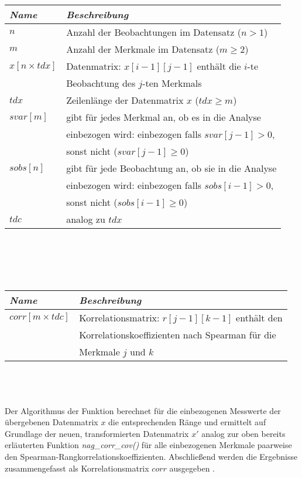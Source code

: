 \noindent \begin{tabular}[ht]{|l|l|}
  	\hline
  	\textit{Name} & \textit{Beschreibung}\\
  	\hline \hline
  	$n$ & Anzahl der Beobachtungen im Datensatz ($n > 1$)\\ \hline
  	$m$ & Anzahl der Merkmale im Datensatz ($m \geq 2$)\\ \hline
	$x[n \times tdx]$ & Datenmatrix: $x[i - 1][j - 1]$ enthält die $i$-te\\
	& Beobachtung des $j$-ten Merkmals\\ \hline
	$tdx$ & Zeilenlänge der Datenmatrix $x$ ($tdx \geq m$)\\ \hline
	$svar[m]$ & gibt für jedes Merkmal an, ob es in die Analyse\\
	& einbezogen wird: einbezogen falls $svar[j-1] > 0$,\\
	& sonst nicht ($svar[j-1] \geq 0$)\\ \hline
	$sobs[n]$ & gibt für jede Beobachtung an, ob sie in die Analyse\\
	& einbezogen wird:  einbezogen falls $sobs[i-1] > 0$, \\
	& sonst nicht ($sobs[i-1] \geq 0$)\\ \hline
	$tdc$ & analog zu $tdx$\\
	\hline
\end{tabular}\\\\

\newpage

\\
	
\noindent \begin{tabular}[ht]{|l|l|}
  	\hline
  	\textit{Name} & \textit{Beschreibung}\\
  	\hline \hline
  	$corr[m \times tdc]$ & Korrelationsmatrix: $r[j - 1][k - 1]$ enthält den\\
	& Korrelationskoeffizienten nach Spearman für die\\
	& Merkmale $j$ und $k$\\
  	\hline
\end{tabular}\\\\

\\

\noindent Der Algorithmus der Funktion berechnet für die einbezogenen Messwerte der übergebenen Datenmatrix $x$ die entsprechenden Ränge und ermittelt auf Grundlage der neuen, transformierten Datenmatrix $x'$ analog zur oben bereits erläuterten Funktion {\it nag\_corr\_cov()} für alle einbezogenen Merkmale paarweise den Spearman-Rangkorrelationskoeffizienten. Abschließend werden die Ergebnisse zusammengefasst als Korrelationsmatrix $corr$ ausgegeben \cite[S. 1]{nag:g02brc}.

